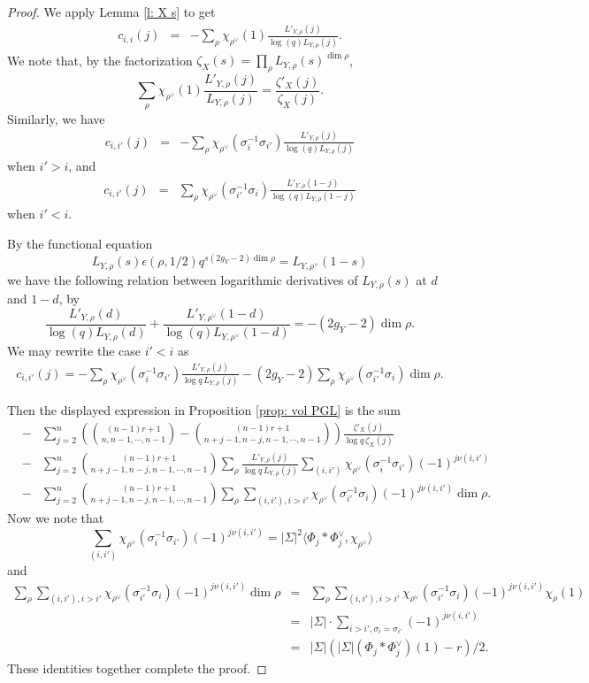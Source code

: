 \documentclass[reqno]{amsart}
\numberwithin{equation}{subsection}
\theoremstyle{definition}
\newcommand{\s}{\sigma}
\newcommand{\z}{\zeta}
\newcommand{\ep}{\epsilon}
\begin{document}
\begin{proof}
We apply Lemma \ref{l: X s} to get
\begin{eqnarray*}
    c_{i,i}(j) &=&-\sum_{\rho} \chi_{\rho^\vee}(1)\frac{L'_{Y,\rho}(j)}{\log(q)L_{Y,\rho}(j)}.
    \end{eqnarray*}
We note that, by the factorization $\z_X(s)=\prod_\rho L_{Y,\rho}(s)^{\dim\rho}$,
$$\sum_{\rho} \chi_{\rho^\vee}(1)\frac{L'_{Y,\rho}(j)}{L_{Y,\rho}(j)}=\frac{\z'_X(j)}{\z_X(j)}.
$$
Similarly, we have
\begin{eqnarray*}
      c_{i,i'}(j) &=&-\sum_{\rho} \chi_{\rho^\vee}(\s_i^{-1}\s_{i'})\frac{L'_{Y,\rho}(j)}{\log(q)L_{Y,\rho}(j)}  
\end{eqnarray*}
when $i'>i$, and
\begin{eqnarray*}c_{i,i'}(j) &=&\sum_{\rho} \chi_{\rho^\vee}(\s_{i'}^{-1}\s_{i})\frac{L'_{Y,\rho}(1-j)}{\log(q)L_{Y,\rho}(1-j)} 
\end{eqnarray*}
when $i'<i$.

By the functional equation
$$L_{Y,\rho}(s)\ep(\rho,1/2) q^{s(2g_Y-2)\dim\rho}=L_{Y,\rho^\vee}(1-s)
$$
we have the following relation between logarithmic derivatives of $L_{Y,\rho}(s)$ at $d$ and $1-d$,
by 
$$
\frac{L'_{Y,\rho}(d)}{\log(q)L_{Y,\rho}(d)}+\frac{L'_{Y,\rho^\vee}(1-d)}{\log(q)L_{Y,\rho^\vee}(1-d)}=-(2g_Y-2)\dim\rho.
$$
We may rewrite the case  $i'<i$ as
\begin{eqnarray*}
c_{i,i'}(j)  =-\sum_{\rho} \chi_{\rho^\vee}(\s_{i}^{-1}\s_{i'})\frac{L'_{Y,\rho}(j)}{\log q\,L_{Y,\rho}(j)}-(2g_Y-2)\sum_{\rho} \chi_{\rho^\vee}(\s_{i'}^{-1}\s_{i}) \dim\rho.
\end{eqnarray*}


Then the displayed expression in Proposition \ref{prop: vol PGL} is the sum 
\begin{eqnarray*}
&-&\sum_{j=2}^n\left(\binom{(n-1)r+1}{n,n-1,\cdots, n-1}-\binom{(n-1)r+1}{n+j-1,n-j,n-1,\cdots, n-1}\right) \frac{\z'_X(j)}{\log q\,\z_X(j)}\\
   &-&\sum_{j=2}^n  \binom{(n-1)r+1}{n+j-1,n-j,n-1,\cdots, n-1}\sum_{\rho}\frac{L'_{Y,\rho}(j)}{\log q \,L_{Y,\rho}(j)} \sum_{(i,i')} \chi_{\rho^\vee}(\s_i^{-1}\s_{i'}) (-1)^{j\nu(i,i')}  \\
   &-&
      \sum_{j=2}^n  \binom{(n-1)r+1}{n+j-1,n-j,n-1,\cdots, n-1} \sum_{\rho} \sum_{(i, i'), i> i'}\chi_{\rho^\vee}(\s_{i'}^{-1}\s_{i})  (-1)^{j\nu(i,i')}  \dim\rho.
\end{eqnarray*}
Now we note that
$$
\sum_{(i,i')} \chi_{\rho^\vee}(\s_i^{-1}\s_{i'}) (-1)^{j\nu(i,i')}=|\Sigma|^2\langle{\Phi_j\ast\Phi_j^\vee, \chi_{\rho^\vee} \rangle}
$$
and
\begin{eqnarray*}
\sum_{\rho} \sum_{(i, i'), i> i'}\chi_{\rho^\vee}(\s_{i'}^{-1}\s_{i}) (-1)^{j\nu(i,i')}  \dim\rho
&=&\sum_{\rho} \sum_{(i, i'), i> i'}\chi_{\rho^\vee}(\s_{i'}^{-1}\s_{i}) (-1)^{j\nu(i,i')}  \chi_{\rho}(1)\\
&=&|\Sigma|\cdot\sum_{ i> i', \s_i=\s_{i'}} (-1)^{j\nu(i,i')} \\
&=&|\Sigma|(|\Sigma|(\Phi_j\ast\Phi_j^\vee)(1)-r)/2.
\end{eqnarray*}
These identities together complete the proof.


\end{proof}
\end{document}
